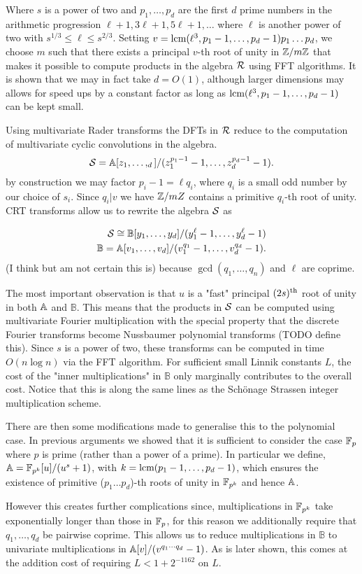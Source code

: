 Where $s$ is a power of two and $p_1, \ldots, p_d$ are the first $d$ prime numbers in the arithmetic progression $\ell + 1, 3\ell + 1, 5\ell + 1, \ldots$ where $\ell$ is another power of two with $s^{1/3} \leq \ell \leq s^{2/3}$.  Setting $v = \textrm{lcm}(\ell^3, p_1 - 1, \ldots, p_d - 1)p_1\dots p_d$, we choose $m$ such that there exists a principal $v$-th root of unity in ${\mathbb Z}/m{\mathbb Z}$ that makes it possible to compute products in the algebra $\mathcal R$ using FFT algorithms. It is shown that we may in fact take $d = O(1)$, although larger dimensions may allows for speed ups by a constant factor as long as $\textrm{lcm}(\ell^3, p_1 - 1, \ldots, p_d - 1)$ can be kept small.

Using multivariate Rader transforms the DFTs in $\mathcal R$ reduce to the computation of multivariate cyclic convolutions in the algebra.
\[
    \mathcal S = {\mathbb A}[z_1, \ldots, _d] / (z_1^{p_1 - 1} - 1, \ldots, z_d^{p_d - 1} - 1).
\]
by construction we may factor $p_i - 1 = \ell q_i$, where $q_i$ is a small odd number by our choice of $s_i$. Since $q_i | v$ we have ${\mathbb Z} /mZ$ contains a primitive $q_i$-th root of unity. CRT transforms allow us to rewrite the algebra $\mathcal S$ as

\begin{align*}
    \mathcal S \cong \mathbb{B}[y_1, \ldots, y_d]/(y_1^\ell - 1, \ldots, y_d^\ell - 1)\\
    \mathbb{B} = \mathbb{A}[v_1, \ldots, v_d] / (v_1^{q_1} - 1, \ldots, v_d^{q_d} - 1).
\end{align*}
(I think but am not certain this is) because $\gcd(q_1, \ldots, q_n)$ and $\ell$ are coprime.

The most important observation is that $u$ is a "fast" principal $(2s)^{\textrm{th}}$ root of unity in both ${\mathbb A}$ and $\mathbb{B}$. This means that the products in $\mathcal S$ can be computed using multivariate Fourier multiplication with the special property that the discrete Fourier transforms become Nussbaumer polynomial transforms (TODO define this). Since $s$ is a power of two, these transforms can be computed in time $O(n \log n)$ via the FFT algorithm. For sufficient small Linnik constants $L$, the cost of the "inner multiplications" in $\mathbb{B}$ only marginally contributes to the overall cost. Notice that this is along the same lines as the Sch\"{o}nage Strassen integer multiplication scheme.

There are then some modifications made to generalise this to the polynomial case. In previous arguments we showed that it is sufficient to consider the case ${\mathbb F}_p$ where $p$ is prime (rather than a power of a prime). In particular we define, ${\mathbb A} = {\mathbb F}_{p^k}[u] / (u^s + 1)$, with $k = \textrm{lcm}(p_1 - 1, \ldots, p_d - 1)$, which ensures the existence of primitive ($p_1 \ldots p_d$)-th roots of unity in ${\mathbb F}_{p^k}$ and hence ${\mathbb A}$.

However this creates further complications since, multiplications in ${\mathbb F}_{p^k}$ take exponentially longer than those in ${\mathbb F}_p$, for this reason we additionally require that $q_1, \ldots, q_d$ be pairwise coprime. This allows us to reduce multiplications in $\mathbb{B}$ to univariate multiplications in ${\mathbb A}[v]/(v^{q_1\cdots q_d} - 1)$. As is later shown, this comes at the addition cost of requiring $L < 1 + 2^{-1162}$ on $L$.
